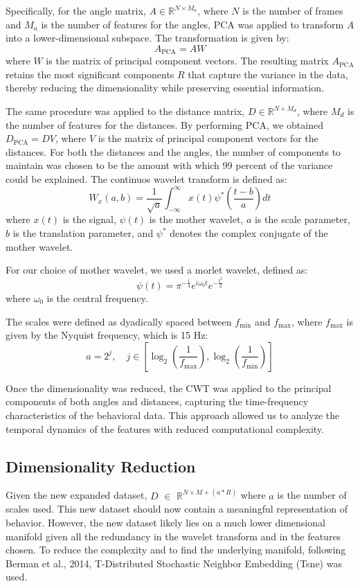 \documentclass[12pt,english]{article}
\begin{document}
Specifically, for the angle matrix, \( A \in \mathbb{R}^{N \times M_{a}} \), where \( N \) is the number of frames and \( M_{a} \) is the number of features for the angles, PCA was applied to transform \( A \) into a lower-dimensional subspace. The transformation is given by:
\[
A_{\text{PCA}} = A W
\]
where \( W \) is the matrix of principal component vectors. The resulting matrix \( A_{\text{PCA}} \) retains the most significant components \( R \) that capture the variance in the data, thereby reducing the dimensionality while preserving essential information.

The same procedure was applied to the distance matrix, \( D \in \mathbb{R}^{N \times M_{d}} \), where \( M_{d} \) is the number of features for the distances. By performing PCA, we obtained \( D_{\text{PCA}} = D V \), where \( V \) is the matrix of principal component vectors for the distances. For both the distances and the angles, the number of components to maintain was chosen to be the amount with which 99 percent of the variance could be explained. 
The continuos wavelet transform is defined as:
\[
W_x(a, b) = \frac{1}{\sqrt{a}} \int_{-\infty}^{\infty} x(t) \psi^*\left(\frac{t - b}{a}\right) dt
\]
where \( x(t) \) is the signal, \( \psi(t) \) is the mother wavelet, \( a \) is the scale parameter, \( b \) is the translation parameter, and \( \psi^* \) denotes the complex conjugate of the mother wavelet.

For our choice of mother wavelet, we used a morlet wavelet, defined as:
\[
\psi(t) = \pi^{-\frac{1}{4}} e^{i \omega_0 t} e^{-\frac{t^2}{2}}
\]
where \( \omega_0 \) is the central frequency. 

The scales were defined as dyadically spaced between \( f_{\min} \) and \( f_{\max} \), where \( f_{\max} \) is given by the Nyquist frequency, which is 15 Hz:
\[
a = 2^j, \quad j \in \left[\log_2\left(\frac{1}{f_{\max}}\right), \log_2\left(\frac{1}{f_{\min}}\right)\right]
\]


Once the dimensionality was reduced, the CWT was applied to the principal components of both angles and distances, capturing the time-frequency characteristics of the behavioral data. This approach allowed us to analyze the temporal dynamics of the features with reduced computational complexity.



\subsection{Dimensionality Reduction}
Given the new expanded dataset, \( D \) $\in$ \( \mathbb{R}^{N \times M+(a * R)} \) where \( a \) is the number of scales used. This new dataset should now contain a meaningful representation of behavior. However, the new dataset likely lies on a much lower dimensional manifold given all the redundancy in the wavelet transform and in the features chosen. To reduce the complexity and to find the underlying manifold, following Berman et al., 2014, T-Distributed Stochastic Neighbor Embedding (Tsne) was used. 
\end{document}
